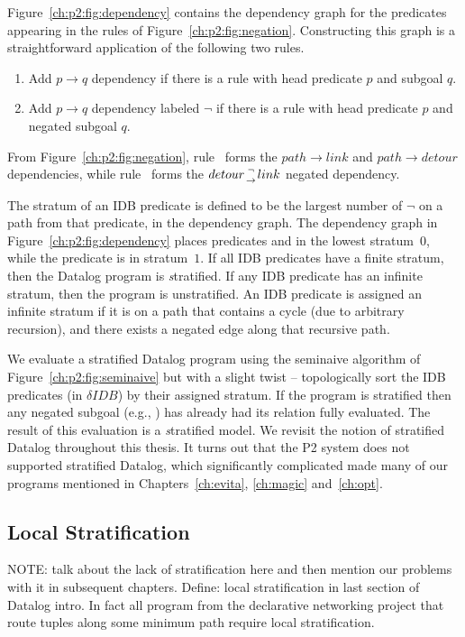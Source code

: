 Figure~\ref{ch:p2:fig:dependency} contains the dependency graph for the predicates
appearing in the rules of Figure~\ref{ch:p2:fig:negation}. Constructing this graph
is a straightforward application of the following two rules.
\begin{enumerate}
  \ssp
  \item Add $p \rightarrow q$ dependency if there is a rule with head predicate $p$ and subgoal $q$.
  \item Add $p \rightarrow q$ dependency labeled $\neg$ if there is a rule with head predicate $p$ and negated subgoal $q$.
\end{enumerate}
From Figure~\ref{ch:p2:fig:negation}, rule~ forms the $path \rightarrow
link$ and $path \rightarrow detour$ dependencies, while rule~ forms the
$detour {\neg \atop \rightarrow} link$ negated dependency. 

The stratum of an IDB predicate is defined to be the largest number of $\neg$
on a path from that predicate, in the dependency graph.  The dependency graph
in Figure~\ref{ch:p2:fig:dependency} places predicates  and
 in the lowest stratum~$0$, while the  predicate is in
stratum~$1$.  If all IDB predicates have a finite stratum, then the Datalog
program is {\emph stratified}.  If any IDB predicate has an infinite stratum,
then the program is unstratified.  An IDB predicate is assigned an infinite
stratum if it is on a path that contains a cycle (due to arbitrary recursion),
and there exists a negated edge along that recursive path.

We evaluate a stratified Datalog program using the seminaive algorithm of
Figure~\ref{ch:p2:fig:seminaive} but with a slight twist -- topologically sort
the IDB predicates (in $\delta IDB$) by their assigned stratum.  If the program is
stratified then any negated subgoal (e.g., ) has already had its
relation fully evaluated.  The result of this evaluation is a {\emph stratified
model}. We revisit the notion of stratified Datalog throughout this thesis. It turns
out that the P2 system does not supported stratified Datalog, which significantly
complicated made many of our \OVERLOG programs mentioned in Chapters~\ref{ch:evita}, 
\ref{ch:magic} and~\ref{ch:opt}.

\subsection{Local Stratification}
NOTE: talk about the lack of stratification here and then mention our 
problems with it in subsequent chapters.
Define: local stratification in last section of Datalog intro.
In fact all program from the declarative networking project that route
tuples along some minimum path require local stratification.


